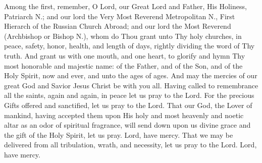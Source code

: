 \begin{liturgicaltext}
    \priest Among the first, remember, O Lord, our Great Lord and Father, His Holiness, Patriarch N.; and our lord the Very Most Reverend Metropolitan N., First Hierarch of the Russian Church Abroad; and our lord the Most Reverend (Archbishop or Bishop N.), whom do Thou grant unto Thy holy churches, in peace, safety, honor, health, and length of days, rightly dividing the word of Thy truth.
    \choir {}
    \priest And grant us with one mouth, and one heart, to glorify and hymn Thy most honorable and majestic name: of the Father, and of the Son, and of the Holy Spirit, now and ever, and unto the ages of ages. 
    \choir {}
    \priest And may the mercies of our great God and Savior Jesus Christ be with you all.
    \choir {}
    \deacon Having called to remembrance all the saints, again and again, in peace let us pray to the Lord.
    \choir {}
    \deacon For the precious Gifts offered and sanctified, let us pray to the Lord.
    \choir {}
    \deacon That our God, the Lover of mankind, having accepted them upon His holy and most heavenly and noetic altar as an odor of spiritual fragrance, will send down upon us divine grace and the gift of the Holy Spirit, let us pray.
    \choir Lord, have mercy.
    \deacon That we may be delivered from all tribulation, wrath, and necessity, let us pray to the Lord.
    \choirsemisecret Lord, have mercy. 
\end{liturgicaltext}
